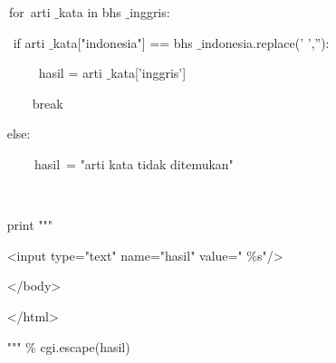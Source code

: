 \documentclass{wileySix}
\begin{document}
\noindent 
~~~~for~arti $  \_  $kata in bhs $  \_  $inggris:    \par
\noindent 
~~~~ if arti $  \_  $kata["indonesia"] == bhs $  \_  $indonesia.replace(' ',''): \par
\noindent 
~~~~~~~~ hasil = arti $  \_  $kata['inggris']  \par
\noindent 
~~~~~~~ break \par
\noindent 
~~~ else: \par
\noindent 
~~~~~~~~hasil~= "arti kata tidak ditemukan"    \par
\noindent 
~~~~~~~~~~~~~~  \par
\noindent 
~~~ print """ \par
\noindent 
~~~ <input type="text" name="hasil" value=" $  \%  $s"/> \par
\noindent 
~~~ </body> \par
\noindent 
~~~ </html> \par
\noindent 
~~~ """  $  \%  $ cgi.escape(hasil) \par
\vspace{12pt}
\end{document}
